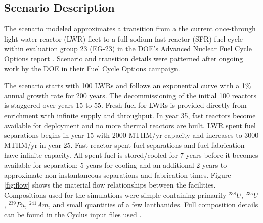 \documentclass{style}
\begin{document}
\subsection{Scenario Description}

The scenario modeled approximates a transition from a the current once-through light water
reactor (LWR) fleet to a full sodium fast reactor (SFR) fuel cycle within evaluation group 23 (EG-23)
in the DOE's Advanced Nuclear Fuel Cycle Options report
\cite{wigeland_nuclear_2014}. Scenario and transition details were patterned
after ongoing work by the DOE in their Fuel Cycle Options campaign.

The scenario starts with 100 LWRs and follows an exponential curve with a 1\%
annual growth rate for 200 years.  The decommissioning of the initial 100
reactors is staggered over years 15 to 55.  Fresh fuel for LWRs is provided directly from enrichment with infinite supply and throughput. In year 35, fast reactors become available for
deployment and no more thermal reactors are built.  LWR spent fuel separations
begins in year 15 with 2000 MTHM/yr capacity and increases to 3000 MTHM/yr in
year 25.  Fast reactor spent fuel separations and fuel fabrication have
infinite capacity.  All spent fuel is stored/cooled for 7 years before it becomes
available for separation: 5 years for cooling and an additional 2 years to approximate non-instantaneous separations and fabrication times. Figure \ref{fig:flow} shows the material flow
relationships between the facilities.  Compositions used for the simulations
were simple containing primarily $^{238}U$, $^{235}U$, $^{239}Pu$, $^{241}Am$,
and small quantities of a few lanthanides.  Full composition details can be
found in the Cyclus input files used \cite{Carlsen2015}.
\end{document}
